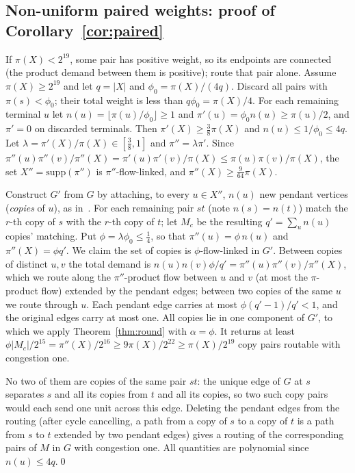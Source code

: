 \documentclass[11pt,letterpaper]{article}
\theoremstyle{definition}
\begin{document}
\subsection{Non-uniform paired weights: proof of Corollary~\ref{cor:paired}}\label{sec:paired}

If $\pi(X)<2^{19}$, some pair has positive weight, so its endpoints are connected (the
product demand between them is positive); route that pair alone. Assume $\pi(X)\ge 2^{19}$
and let $q=|X|$ and $\phi_0=\pi(X)/(4q)$. Discard all pairs with $\pi(s)<\phi_0$; their total
weight is less than $q\phi_0=\pi(X)/4$. For each remaining terminal $u$ let
$n(u)=\lfloor\pi(u)/\phi_0\rfloor\ge1$ and $\pi'(u)=\phi_0n(u)\ge\pi(u)/2$, and $\pi'=0$ on
discarded terminals. Then $\pi'(X)\ge\frac38\pi(X)$ and $n(u)\le1/\phi_0\le 4q$. Let
$\lambda=\pi'(X)/\pi(X)\in[\frac38,1]$ and $\pi''=\lambda\pi'$. Since
$\pi''(u)\pi''(v)/\pi''(X)=\pi'(u)\pi'(v)/\pi(X)\le\pi(u)\pi(v)/\pi(X)$, the set
$X''=\mathrm{supp}(\pi'')$ is $\pi''$-flow-linked, and $\pi''(X)\ge\frac{9}{64}\pi(X)$.

Construct $G'$ from $G$ by attaching, to every $u\in X''$, $n(u)$ new pendant vertices
(\emph{copies} of $u$), as in~\cite[Lemma~1.1]{CKS05}. For each remaining pair $st$ (note $n(s)=n(t)$) match the $r$-th copy
of $s$ with the $r$-th copy of $t$; let $M_c$ be the resulting $q'=\sum_u n(u)$ copies'
matching. Put $\phi=\lambda\phi_0\le\frac14$, so that $\pi''(u)=\phi\,n(u)$ and
$\pi''(X)=\phi q'$. We claim the set of copies is $\phi$-flow-linked in $G'$. Between copies of
distinct $u,v$ the total demand is $n(u)n(v)\phi/q'=\pi''(u)\pi''(v)/\pi''(X)$, which we route
along the $\pi''$-product flow between $u$ and $v$ (at most the $\pi$-product flow) extended by
the pendant edges; between two copies of the same $u$ we route through $u$. Each pendant edge
carries at most $\phi(q'-1)/q'<1$, and the original edges carry at most one. All copies lie in
one component of $G'$, to which we apply Theorem~\ref{thm:round} with $\alpha=\phi$. It
returns at least $\phi|M_c|/2^{15}=\pi''(X)/2^{16}\ge 9\pi(X)/2^{22}\ge\pi(X)/2^{19}$ copy pairs
routable with congestion one.

No two of them are copies of the same pair $st$: the unique edge of $G$ at $s$ separates $s$
and all its copies from $t$ and all its copies, so two such copy pairs would each send one
unit across this edge. Deleting the pendant edges from the routing (after cycle cancelling,
a path from a copy of $s$ to a copy of $t$ is a path from $s$ to $t$ extended by two pendant
edges) gives a routing of the corresponding pairs of $M$ in $G$ with congestion one. All
quantities are polynomial since $n(u)\le4q$.\qed
\end{document}

